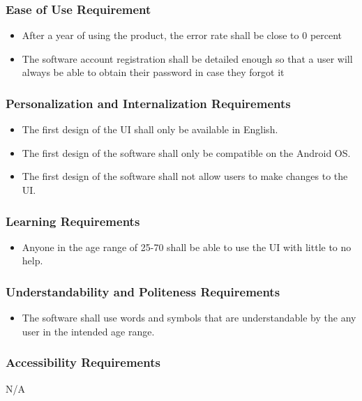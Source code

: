 \documentclass[12pt]{article}
\begin{document}
\subsubsection{Ease of Use Requirement}
\begin{itemize}
\item After a year of using the product, the error rate shall be close to 0 percent
\item The software account registration shall be detailed enough so that a user will always be able to obtain their password in case they forgot it
\end{itemize}

\subsubsection{Personalization and Internalization Requirements}
\begin{itemize}
\item The first design of the UI shall only be available in English.
\item The first design of the software shall only be compatible on the Android OS.
\item The first design of the software shall not allow users to make changes to the UI.
\end{itemize}

\subsubsection{Learning Requirements}
\begin{itemize}
\item Anyone in the age range of 25-70 shall be able to use the UI with little to no help.
\end{itemize}

\subsubsection{Understandability and Politeness Requirements}
\begin{itemize}
\item The software shall use words and symbols that are understandable by the any user in the intended age range.
\end{itemize}
\subsubsection{Accessibility Requirements}
N/A
\end{document}
